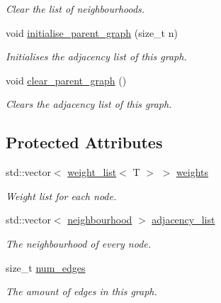 \begin{DoxyCompactItemize}
\begin{DoxyCompactList}\small\item\em Clear the list of neighbourhoods. \end{DoxyCompactList}\item 
void \hyperlink{classlgraph_1_1xxgraph_a50c658dd39e6b1d38bf7e514daa2f33c}{initialise\-\_\-parent\-\_\-graph} (size\-\_\-t n)
\begin{DoxyCompactList}\small\item\em Initialises the adjacency list of this graph. \end{DoxyCompactList}\item 
void \hyperlink{classlgraph_1_1xxgraph_a4122495066e4402cbf6d2d9bb82d54cc}{clear\-\_\-parent\-\_\-graph} ()
\begin{DoxyCompactList}\small\item\em Clears the adjacency list of this graph. \end{DoxyCompactList}\end{DoxyCompactItemize}
\subsection*{Protected Attributes}
\begin{DoxyCompactItemize}
\item 
std\-::vector$<$ \hyperlink{namespacelgraph_a1e0fd5ef0a78b2a92da48adbed265cb6}{weight\-\_\-list}$<$ T $>$ $>$ \hyperlink{classlgraph_1_1wxgraph_a6f8c983edc82913c2d78b7bc871defe8}{weights}
\begin{DoxyCompactList}\small\item\em Weight list for each node. \end{DoxyCompactList}\item 
\hypertarget{classlgraph_1_1xxgraph_a31cf82d0b20be05290be259dc97a51ec}{std\-::vector$<$ \hyperlink{namespacelgraph_a052e7766c13f3a43cec0aec8173fdede}{neighbourhood} $>$ \hyperlink{classlgraph_1_1xxgraph_a31cf82d0b20be05290be259dc97a51ec}{adjacency\-\_\-list}}\label{classlgraph_1_1xxgraph_a31cf82d0b20be05290be259dc97a51ec}

\begin{DoxyCompactList}\small\item\em The neighbourhood of every node. \end{DoxyCompactList}\item 
\hypertarget{classlgraph_1_1xxgraph_a6765a9a3be42f6e0f824635c593b35d7}{size\-\_\-t \hyperlink{classlgraph_1_1xxgraph_a6765a9a3be42f6e0f824635c593b35d7}{num\-\_\-edges}}\label{classlgraph_1_1xxgraph_a6765a9a3be42f6e0f824635c593b35d7}

\begin{DoxyCompactList}\small\item\em The amount of edges in this graph. \end{DoxyCompactList}\end{DoxyCompactItemize}
